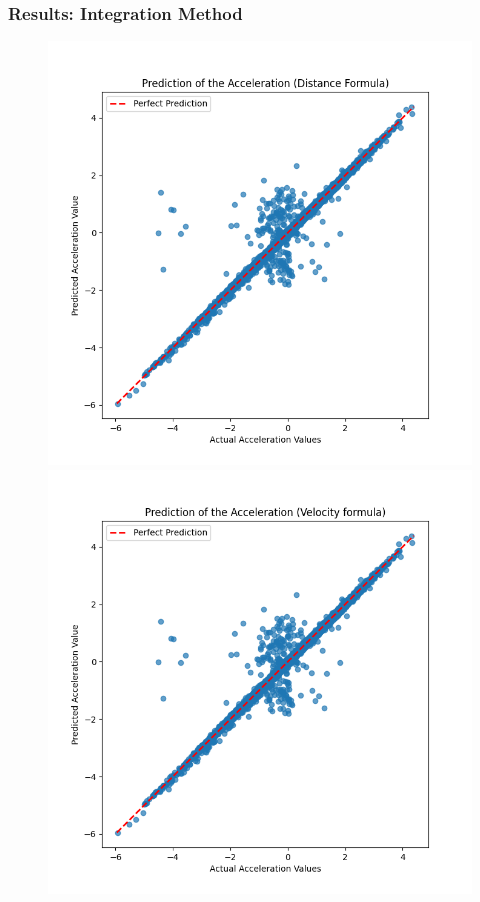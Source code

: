 \begin{frame}
  \frametitle{Results: Integration Method}
  \begin{figure}
    \centering
    \begin{minipage}[b]{0.49\linewidth}
        \includegraphics[width=\textwidth]{figures/graphs/Prediction of the Acceleration (Distance Formula).png}
    \end{minipage}
    \begin{minipage}[b]{0.49\linewidth}
      \centering
        \includegraphics[width=\textwidth]{figures/graphs/Prediction of the Acceleration (Velocity formula).png}
    \end{minipage}
  \end{figure}
\end{frame}

